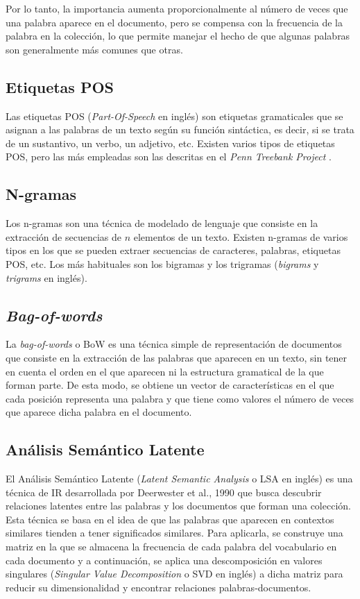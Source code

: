 \bigskip
Por lo tanto, la importancia aumenta proporcionalmente al número de veces que una palabra aparece en el documento, pero se compensa con la frecuencia 
de la palabra en la colección, lo que permite manejar el hecho de que algunas palabras son generalmente más comunes que otras.

\subsection{Etiquetas POS}

Las etiquetas POS (\textit{Part-Of-Speech} en inglés) son etiquetas gramaticales que se asignan a las palabras de un texto según su función sintáctica, es
decir, si se trata de un sustantivo, un verbo, un adjetivo, etc.
Existen varios tipos de etiquetas POS, pero las más empleadas son las descritas en el \textit{Penn Treebank Project} \cite{marcus1993building}.

\subsection{N-gramas}

Los n-gramas son una técnica de modelado de lenguaje que consiste en la extracción de secuencias de $n$ elementos de un texto. Existen n-gramas de varios tipos
en los que se pueden extraer secuencias de caracteres, palabras, etiquetas POS, etc. Los más habituales son los bigramas y los trigramas (\textit{bigrams} y \textit{trigrams} en inglés).

\subsection{\textit{Bag-of-words}}

La \textit{bag-of-words} o BoW es una técnica simple de representación de documentos que consiste en la extracción de las palabras que aparecen en un texto,
sin tener en cuenta el orden en el que aparecen ni la estructura gramatical de la que forman parte. De esta modo, se obtiene un vector de características en el 
que cada posición representa una palabra y que tiene como valores el número de veces que aparece dicha palabra en el documento.

\subsection{Análisis Semántico Latente}
\label{sec:analisis_semantico_latente}

El Análisis Semántico Latente (\textit{Latent Semantic Analysis} o LSA en inglés) es una técnica de IR desarrollada por Deerwester et al., 1990 \cite{deerwester1990indexing}
que busca descubrir relaciones latentes
entre las palabras y los documentos que forman una colección. Esta técnica se basa
en el idea de que las palabras que aparecen en contextos similares
tienden a tener significados similares. Para aplicarla, se construye una matriz en la que se almacena la frecuencia de cada palabra del vocabulario en cada documento y
a continuación, se aplica una descomposición en valores singulares (\textit{Singular Value Decomposition} o SVD en inglés) a dicha matriz para reducir su dimensionalidad
y encontrar relaciones palabras-documentos.

